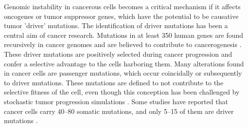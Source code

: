      Genomic instability in cancerous cells becomes a critical mechanism if it
      affects oncogenes or tumor suppressor genes, which have the potential to
      be causative tumor 'driver' mutations. The identification of driver
      mutations has been a central aim of cancer research. Mutations in at least
      350 human genes are found recursively in cancer genomes and are believed
      to contribute to cancerogenesis {\cite{cancer_genome}}. These driver
      mutations are positively selected during cancer progression and confer a
      selective advantage to the cells harboring them. Many alterations found in
      cancer cells are passenger mutations, which occur coincidally or
      subsequently to driver mutations. These mutations are defined to not
      contribute to the selective fitness of the cell, even though this
      conception has been challenged by stochastic tumor progression simulations
      {\cite{stochastic_cancer}}. Some studies have reported that cancer cells
      carry 40--80 somatic mutations, and only 5--15 of them are driver
      mutations {\cite{som_mut}}.

